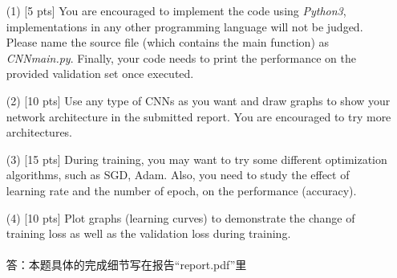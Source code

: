 \documentclass{article}
\begin{document}
	\begin{enumerate}
		    \item[(1)] [5 pts] You are encouraged to implement the code using \emph{Python3}, implementations in any other programming language will not be judged. Please name the source file (which contains the main function) as \emph{CNN\underline{\hspace{0.5em}}main.py}. Finally, your code needs to print the performance on the provided validation set once executed.
		    \item[(2)] [10 pts] Use any type of CNNs as you want and draw graphs to show your network architecture in the submitted report. You are encouraged to try more architectures.
		    \item [(3)] [15 pts] During training, you may want to try some different optimization algorithms, such as SGD, Adam. Also, you need to study the effect of learning rate and the number of epoch, on the performance (accuracy).
		    \item [(4)] [10 pts] Plot graphs (learning curves) to demonstrate the change of training loss as well as the validation loss during training.
\\\\答：本题具体的完成细节写在报告“report.pdf”里\\
\end{enumerate}
\end{document}
